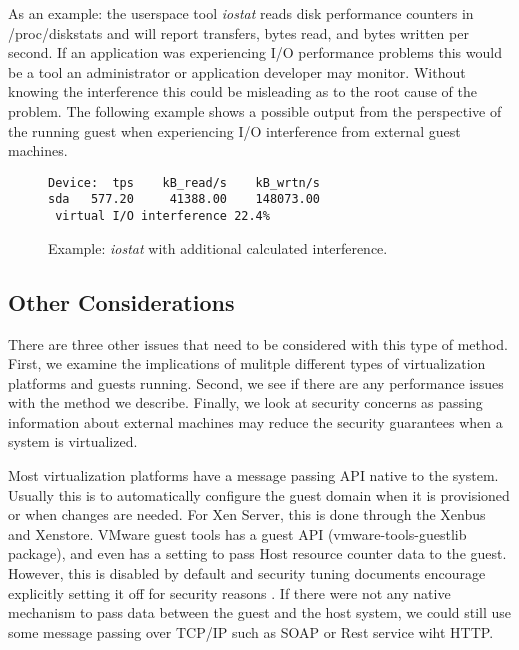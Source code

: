 \indent As an example: the userspace tool \emph{iostat} reads disk performance counters in /proc/diskstats and will report transfers, bytes read, and bytes written per second.  If an application was experiencing I/O performance problems this would be a tool an administrator or application developer may monitor.  Without knowing the interference this could be misleading as to the root cause of the problem.  The following example shows a possible output from the perspective of the running guest when experiencing I/O interference from external guest machines.

\begin{figure}[h]
\begin{Verbatim}
Device:  tps    kB_read/s    kB_wrtn/s
sda   577.20     41388.00    148073.00
 virtual I/O interference 22.4%     
\end{Verbatim}
\label{fig:iostat}
\caption{Example:  \emph{iostat} with additional calculated interference.}
\end{figure}

\subsection{Other Considerations}
There are three other issues that need to be considered with this type of method.  First, we examine the implications of mulitple different types of virtualization platforms and guests running.  Second, we see if there are any performance issues with the method we describe.  Finally, we look at security concerns as passing information about external machines may reduce the security guarantees when a system is virtualized.

Most virtualization platforms have a message passing API native to the system.  Usually this is to automatically configure the guest domain when it is provisioned or when changes are needed.  For Xen Server, this is done through the Xenbus and Xenstore.  VMware guest tools has a guest API (vmware-tools-guestlib package), and even has a setting to pass Host resource counter data to the guest.  However, this is disabled by default and security tuning documents encourage explicitly setting it off for security reasons \cite{vmwarepubs}.  If there were not any native mechanism to pass data between the guest and the host system, we could still use some message passing over TCP/IP such as SOAP or Rest service wiht HTTP.

